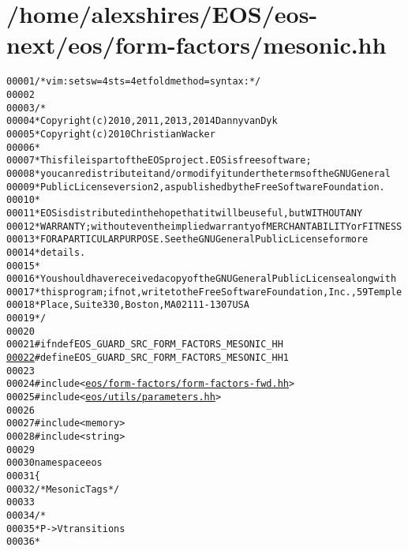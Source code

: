 \hypertarget{mesonic_8hh_source}{
\section{/home/alexshires/EOS/eos-\/next/eos/form-\/factors/mesonic.hh}
}


\begin{footnotesize}\begin{alltt}
00001 \textcolor{comment}{/* vim: set sw=4 sts=4 et foldmethod=syntax : */}
00002 
00003 \textcolor{comment}{/*}
00004 \textcolor{comment}{ * Copyright (c) 2010, 2011, 2013, 2014 Danny van Dyk}
00005 \textcolor{comment}{ * Copyright (c) 2010 Christian Wacker}
00006 \textcolor{comment}{ *}
00007 \textcolor{comment}{ * This file is part of the EOS project. EOS is free software;}
00008 \textcolor{comment}{ * you can redistribute it and/or modify it under the terms of the GNU General}
00009 \textcolor{comment}{ * Public License version 2, as published by the Free Software Foundation.}
00010 \textcolor{comment}{ *}
00011 \textcolor{comment}{ * EOS is distributed in the hope that it will be useful, but WITHOUT ANY}
00012 \textcolor{comment}{ * WARRANTY; without even the implied warranty of MERCHANTABILITY or FITNESS}
00013 \textcolor{comment}{ * FOR A PARTICULAR PURPOSE.  See the GNU General Public License for more}
00014 \textcolor{comment}{ * details.}
00015 \textcolor{comment}{ *}
00016 \textcolor{comment}{ * You should have received a copy of the GNU General Public License along with}
00017 \textcolor{comment}{ * this program; if not, write to the Free Software Foundation, Inc., 59 Temple}
00018 \textcolor{comment}{ * Place, Suite 330, Boston, MA  02111-1307  USA}
00019 \textcolor{comment}{ */}
00020 
00021 \textcolor{preprocessor}{#ifndef EOS\_GUARD\_SRC\_FORM\_FACTORS\_MESONIC\_HH}
\hypertarget{mesonic_8hh_source_l00022}{}\hyperlink{mesonic_8hh_af14d4cdc53d4012250bcb57e3d8cc2d9}{00022} \textcolor{preprocessor}{}\textcolor{preprocessor}{#define EOS\_GUARD\_SRC\_FORM\_FACTORS\_MESONIC\_HH 1}
00023 \textcolor{preprocessor}{}
00024 \textcolor{preprocessor}{#include <\hyperlink{form-factors-fwd_8hh}{eos/form-factors/form-factors-fwd.hh}>}
00025 \textcolor{preprocessor}{#include <\hyperlink{parameters_8hh}{eos/utils/parameters.hh}>}
00026 
00027 \textcolor{preprocessor}{#include <memory>}
00028 \textcolor{preprocessor}{#include <string>}
00029 
00030 \textcolor{keyword}{namespace }eos
00031 \{
00032     \textcolor{comment}{/* Mesonic Tags */}
00033 
00034     \textcolor{comment}{/*}
00035 \textcolor{comment}{     * P -> V transitions}
00036 \textcolor{comment}{     *}

\end{alltt}
\end{footnotesize}
